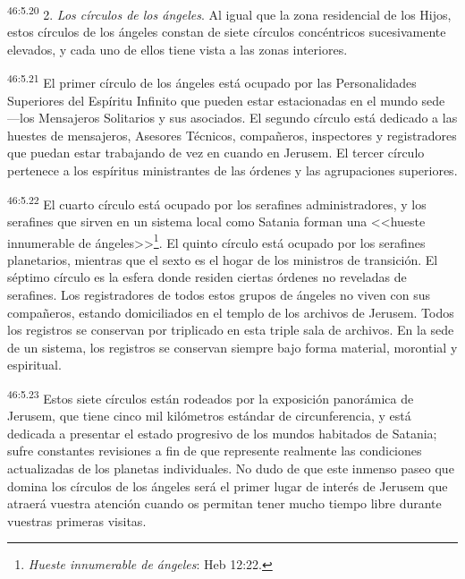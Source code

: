 \par
\textsuperscript{46:5.20} 2. \textit{Los círculos de los ángeles}. Al igual que la zona residencial de los Hijos, estos círculos de los ángeles constan de siete círculos concéntricos sucesivamente elevados, y cada uno de ellos tiene vista a las zonas interiores.

\par
\textsuperscript{46:5.21} El primer círculo de los ángeles está ocupado por las Personalidades Superiores del Espíritu Infinito que pueden estar estacionadas en el mundo sede ---los Mensajeros Solitarios y sus asociados. El segundo círculo está dedicado a las huestes de mensajeros, Asesores Técnicos, compañeros, inspectores y registradores que puedan estar trabajando de vez en cuando en Jerusem. El tercer círculo pertenece a los espíritus ministrantes de las órdenes y las agrupaciones superiores.

\par
\textsuperscript{46:5.22} El cuarto círculo está ocupado por los serafines administradores, y los serafines que sirven en un sistema local como Satania forman una <<hueste innumerable de ángeles>>\footnote{\textit{Hueste innumerable de ángeles}: Heb 12:22.}. El quinto círculo está ocupado por los serafines planetarios, mientras que el sexto es el hogar de los ministros de transición. El séptimo círculo es la esfera donde residen ciertas órdenes no reveladas de serafines. Los registradores de todos estos grupos de ángeles no viven con sus compañeros, estando domiciliados en el templo de los archivos de Jerusem. Todos los registros se conservan por triplicado en esta triple sala de archivos. En la sede de un sistema, los registros se conservan siempre bajo forma material, morontial y espiritual.

\par
\textsuperscript{46:5.23} Estos siete círculos están rodeados por la exposición panorámica de Jerusem, que tiene cinco mil kilómetros estándar de circunferencia, y está dedicada a presentar el estado progresivo de los mundos habitados de Satania; sufre constantes revisiones a fin de que represente realmente las condiciones actualizadas de los planetas individuales. No dudo de que este inmenso paseo que domina los círculos de los ángeles será el primer lugar de interés de Jerusem que atraerá vuestra atención cuando os permitan tener mucho tiempo libre durante vuestras primeras visitas.

